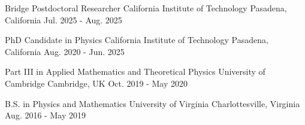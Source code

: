 


\begin{cventries}

    \cventry
        {Bridge Postdoctoral Researcher} %
        {California Institute of Technology} %
        {Pasadena, California} %
        {Jul. 2025 - Aug. 2025} %
        {%
          }

  
  \cventry
    {PhD Candidate in Physics} %
    {California Institute of Technology} %
    {Pasadena, California} %
    {Aug. 2020 - Jun. 2025} %
    {%
      }
      
  \cventry
    {Part III in Applied Mathematics and Theoretical Physics}
    {University of Cambridge} %
    {Cambridge, UK} %
    {Oct. 2019 - May 2020} %
    {%
    }
    
  \cventry
    {B.S. in Physics and Mathematics} %
    {University of Virginia} %
    {Charlottesville, Virginia} %
    {Aug. 2016 - May 2019} %
    {%
    }

\end{cventries}
